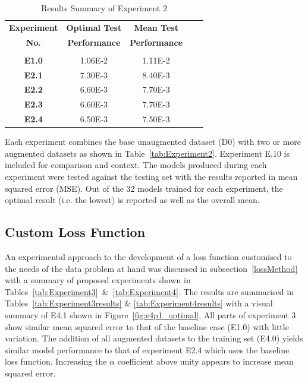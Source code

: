 \begin{table}[h!]
	 \begin{center}
		
		\begin{tabular}{c|c|c|r|c} %
			\textbf{Experiment} & \textbf{Optimal Test} & \textbf{Mean Test}  \\
			
			\textbf{No.} & \textbf{Performance} & \textbf{Performance}  \\
			
			\hline
			& & \\
			\textbf{E1.0} & 1.06E-2 & 1.11E-2 \\
			\textbf{E2.1} & 7.30E-3 & 8.40E-3 \\  
			\textbf{E2.2} & 6.60E-3 & 7.70E-3 \\
			\textbf{E2.3} & 6.60E-3 & 7.70E-3 \\
			\textbf{E2.4} & 6.50E-3 & 7.50E-3 \\ 
			
		\end{tabular}
		\caption{Results Summary of Experiment 2} {Each experiment combines the base unaugmented dataset (D0) with two or more augmented datasets as shown in Table~\ref{tab:Experiment2}. 
			Experiment E.10 is included for comparison and context. The models produced during each experiment were tested against the testing set with the results reported in mean squared error (MSE). Out of the 32 models trained for each experiment, the optimal result (i.e. the lowest) is reported as well as the overall mean.  }
		\label{tab:Experiment2results}
		 \end{center}
\end{table}

\subsection{Custom Loss Function} \label{lossResults}

An experimental approach to the development of a loss function customised to the needs of the data problem at hand was discussed in subsection~\ref{lossMethod} with a summary of proposed experiments shown in Tables~\ref{tab:Experiment3}~\&~\ref{tab:Experiment4}. The results are summarised in Tables~\ref{tab:Experiment3results} \& \ref{tab:Experiment4results} with a visual summary of E4.1 shown in Figure~\ref{fig:e4p1_optimal}. All parts of experiment 3 show similar mean squared error to that of the baseline case (E1.0) with little variation. The addition of all augmented datasets to the training set (E4.0) yields similar model performance to that of experiment E2.4 which uses the baseline loss function. Increasing the $\alpha$ coefficient above unity appears to increase mean squared error. 

